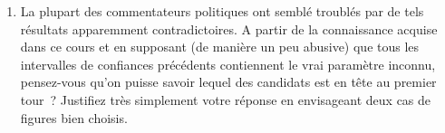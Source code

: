 \documentclass[]{article}
\begin{document}
\begin{exercice}
\begin{enumerate}
 
\item La plupart des commentateurs politiques ont semblé troublés par de tels résultats apparemment contradictoires. A partir de la connaissance acquise dans ce cours et en supposant (de manière un peu abusive) que tous les intervalles de confiances précédents contiennent le vrai paramètre inconnu, pensez-vous qu'on puisse savoir lequel des candidats est en tête au premier tour~? Justifiez très simplement votre réponse en envisageant deux cas de figures bien choisis.   



\end{enumerate}
\end{exercice}
\end{document}
